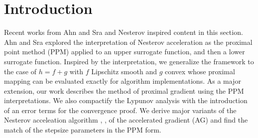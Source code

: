 \documentclass[12pt]{article}
\begin{document}
\section{Introduction}
    Recent works from Ahn and Sra \cite{ahn_understanding_2022} and Nesterov \cite{nesterov_lectures_2018} inspired content in this section.
    Ahn and Sra explored the interpretation of Nesterov acceleration as the proximal point method (PPM) applied to an upper surrogate function, and then a lower surrogate function. 
    Inspired by the interpretation, we generalize the framework to the case of $h = f + g$ with $f$ Lipschitz smooth and $g$ convex whose proximal mapping can be evaluated exactly for algorithm implementations. 
    As a major extension, our work describes the method of proximal gradient using the PPM interpretations. We also compactify the Lypunov analysis with the introduction of an error terms for the convergence proof. We derive major variants of the Nesterov acceleation algorithm
    \cite{chambolle_convergence_2015}, \cite{beck_fast_2009}, \cite[Chapter 12]{ryu_large-scale_2022}
    of the accelerated gradient (AG) and find the match of the stepsize parameters in the PPM form. 
\end{document}
